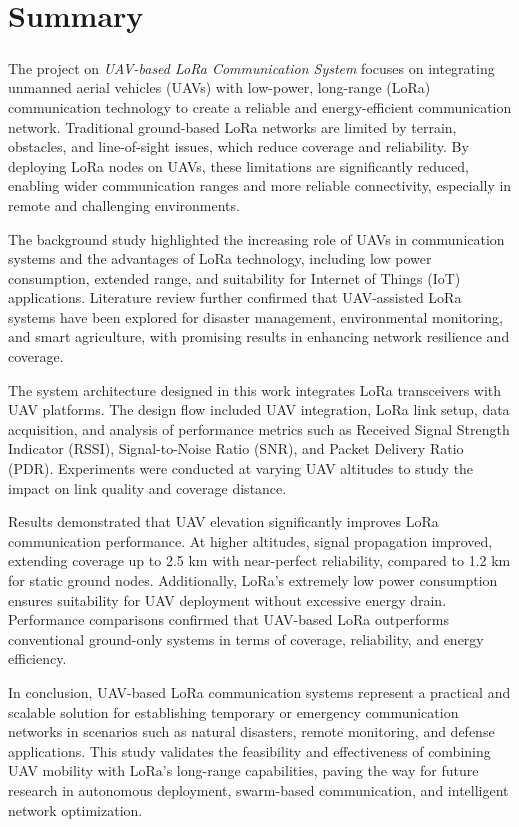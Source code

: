 





\chapter{Summary}

\paragraph{} 
The project on \textit{UAV-based LoRa Communication System} focuses on integrating unmanned aerial vehicles (UAVs) with low-power, long-range (LoRa) communication technology to create a reliable and energy-efficient communication network. Traditional ground-based LoRa networks are limited by terrain, obstacles, and line-of-sight issues, which reduce coverage and reliability. By deploying LoRa nodes on UAVs, these limitations are significantly reduced, enabling wider communication ranges and more reliable connectivity, especially in remote and challenging environments.

The background study highlighted the increasing role of UAVs in communication systems and the advantages of LoRa technology, including low power consumption, extended range, and suitability for Internet of Things (IoT) applications. Literature review further confirmed that UAV-assisted LoRa systems have been explored for disaster management, environmental monitoring, and smart agriculture, with promising results in enhancing network resilience and coverage.

The system architecture designed in this work integrates LoRa transceivers with UAV platforms. The design flow included UAV integration, LoRa link setup, data acquisition, and analysis of performance metrics such as Received Signal Strength Indicator (RSSI), Signal-to-Noise Ratio (SNR), and Packet Delivery Ratio (PDR). Experiments were conducted at varying UAV altitudes to study the impact on link quality and coverage distance.

Results demonstrated that UAV elevation significantly improves LoRa communication performance. At higher altitudes, signal propagation improved, extending coverage up to 2.5 km with near-perfect reliability, compared to 1.2 km for static ground nodes. Additionally, LoRa’s extremely low power consumption ensures suitability for UAV deployment without excessive energy drain. Performance comparisons confirmed that UAV-based LoRa outperforms conventional ground-only systems in terms of coverage, reliability, and energy efficiency.

In conclusion, UAV-based LoRa communication systems represent a practical and scalable solution for establishing temporary or emergency communication networks in scenarios such as natural disasters, remote monitoring, and defense applications. This study validates the feasibility and effectiveness of combining UAV mobility with LoRa’s long-range capabilities, paving the way for future research in autonomous deployment, swarm-based communication, and intelligent network optimization.

 
